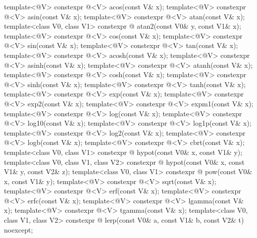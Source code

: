 \begin{itemdecl}
template<@\mathfloatingpoint@ V> constexpr @\deducedsimd@<V> acos(const V& x);
template<@\mathfloatingpoint@ V> constexpr @\deducedsimd@<V> asin(const V& x);
template<@\mathfloatingpoint@ V> constexpr @\deducedsimd@<V> atan(const V& x);
template<class V0, class V1>
  constexpr @ atan2(const V0& y, const V1& x);
template<@\mathfloatingpoint@ V> constexpr @\deducedsimd@<V> cos(const V& x);
template<@\mathfloatingpoint@ V> constexpr @\deducedsimd@<V> sin(const V& x);
template<@\mathfloatingpoint@ V> constexpr @\deducedsimd@<V> tan(const V& x);
template<@\mathfloatingpoint@ V> constexpr @\deducedsimd@<V> acosh(const V& x);
template<@\mathfloatingpoint@ V> constexpr @\deducedsimd@<V> asinh(const V& x);
template<@\mathfloatingpoint@ V> constexpr @\deducedsimd@<V> atanh(const V& x);
template<@\mathfloatingpoint@ V> constexpr @\deducedsimd@<V> cosh(const V& x);
template<@\mathfloatingpoint@ V> constexpr @\deducedsimd@<V> sinh(const V& x);
template<@\mathfloatingpoint@ V> constexpr @\deducedsimd@<V> tanh(const V& x);
template<@\mathfloatingpoint@ V> constexpr @\deducedsimd@<V> exp(const V& x);
template<@\mathfloatingpoint@ V> constexpr @\deducedsimd@<V> exp2(const V& x);
template<@\mathfloatingpoint@ V> constexpr @\deducedsimd@<V> expm1(const V& x);
template<@\mathfloatingpoint@ V> constexpr @\deducedsimd@<V> log(const V& x);
template<@\mathfloatingpoint@ V> constexpr @\deducedsimd@<V> log10(const V& x);
template<@\mathfloatingpoint@ V> constexpr @\deducedsimd@<V> log1p(const V& x);
template<@\mathfloatingpoint@ V> constexpr @\deducedsimd@<V> log2(const V& x);
template<@\mathfloatingpoint@ V> constexpr @\deducedsimd@<V> logb(const V& x);
template<@\mathfloatingpoint@ V> constexpr @\deducedsimd@<V> cbrt(const V& x);
template<class V0, class V1>
  constexpr @ hypot(const V0& x, const V1& y);
template<class V0, class V1, class V2>
  constexpr @ hypot(const V0& x, const V1& y, const V2& z);
template<class V0, class V1>
  constexpr @ pow(const V0& x, const V1& y);
template<@\mathfloatingpoint@ V> constexpr @\deducedsimd@<V> sqrt(const V& x);
template<@\mathfloatingpoint@ V> constexpr @\deducedsimd@<V> erf(const V& x);
template<@\mathfloatingpoint@ V> constexpr @\deducedsimd@<V> erfc(const V& x);
template<@\mathfloatingpoint@ V> constexpr @\deducedsimd@<V> lgamma(const V& x);
template<@\mathfloatingpoint@ V> constexpr @\deducedsimd@<V> tgamma(const V& x);
template<class V0, class V1, class V2>
  constexpr @ lerp(const V0& a, const V1& b, const V2& t) noexcept;

\end{itemdecl}
